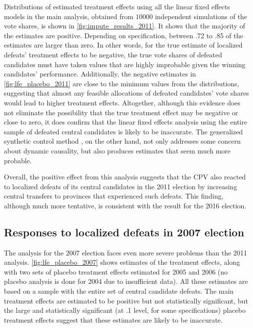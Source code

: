 \documentclass[12pt]{article}
\newcommand{\1}{\mathbbm{1}}
\begin{document}
Distributions of estimated treatment effects using all the linear fixed effects models in the main analysis, obtained from $10000$ independent simulations of the vote shares, is shown in \autoref{fig:impute_results_2011}. It shows that the majority of the estimates are positive. Depending on specification, between .72 to .85 of the estimates are larger than zero. In other words, for the true estimate of localized defeats' treatment effects to be negative, the true vote shares of defeated candidates must have taken values that are highly improbable given the winning candidates' performance. Additionally, the negative estimates in \autoref{fig:lfe_placebo_2011} are close to the minimum values from the distributions, suggesting that almost any feasible allocations of defeated candidates' vote shares would lead to higher treatment effects. Altogether, although this evidence does not eliminate the possibility that the true treatment effect may be negative or close to zero, it does confirm that the linear fixed effects analysis using the entire sample of defeated central candidates is likely to be inaccurate. The generalized synthetic control method \citep{Xu2017gsynth}, on the other hand, not only addresses some concern about dynamic causality, but also produces estimates that seem much more probable. 

Overall, the positive effect from this analysis suggests that the CPV also reacted to localized defeats of its central candidates in the 2011 election by increasing central transfers to provinces that experienced such defeats. This finding, although much more tentative, is consistent with the result for the 2016 election.
 
\subsection{Responses to localized defeats in 2007 election}

The analysis for the 2007 election faces even more severe problems than the 2011 analysis. \autoref{fig:lfe_placebo_2007} shows estimates of the treatment effects, along with two sets of placebo treatment effects estimated for 2005 and 2006 (no placebo analysis is done for 2004 due to insufficient data). All these estimates are based on a sample with the entire set of central candidate defeats. The main treatment effects are estimated to be positive but not statistically significant, but the large and statistically significant (at .1 level, for some specifications) placebo treatment effects suggest that these estimates are likely to be inaccurate.
\end{document}
